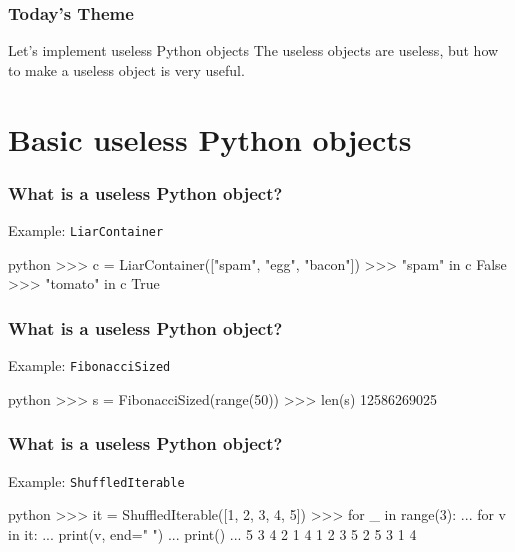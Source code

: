 \documentclass[aspectratio=169,dvipdfmx,12pt,notheorems]{beamer}
\theoremstyle{definition}
\begin{document}
\begin{frame}\frametitle{Today's Theme}

\begin{block}{Let's implement useless Python objects}
The useless objects are useless, but how to make a useless object is very useful.
\end{block}

\end{frame}

\section{Basic useless Python objects}

\begin{frame}[fragile]\frametitle{What is a useless Python object?}

\begin{exampleblock}{Example: \texttt{LiarContainer}}
\begin{pygments}{python}
>>> c = LiarContainer(["spam", "egg", "bacon"])
>>> "spam" in c
False
>>> "tomato" in c
True
\end{pygments}
\end{exampleblock}

\end{frame}
\begin{frame}[fragile]\frametitle{What is a useless Python object?}

\begin{exampleblock}{Example: \texttt{FibonacciSized}}
\begin{pygments}{python}
>>> s = FibonacciSized(range(50))
>>> len(s)
12586269025
\end{pygments}
\end{exampleblock}

\end{frame}

\begin{frame}[fragile]\frametitle{What is a useless Python object?}

\begin{exampleblock}{Example: \texttt{ShuffledIterable}}
\begin{pygments}{python}
>>> it = ShuffledIterable([1, 2, 3, 4, 5])
>>> for _ in range(3):
...     for v in it:
...         print(v, end=" ")
...     print()
...
5 3 4 2 1 
4 1 2 3 5 
2 5 3 1 4
\end{pygments}
\end{exampleblock}

\end{frame}
\end{document}

